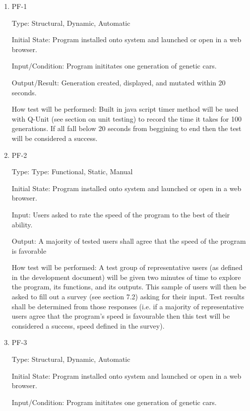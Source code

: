 \documentclass[12pt, titlepage]{article}
\begin{document}
\begin{enumerate}

\item{PF-1\\}

Type: Structural, Dynamic, Automatic
					
Initial State: Program installed onto system and launched or open in a web browser.
					
Input/Condition: Program inititates one generation of genetic cars.
					
Output/Result: Generation created, displayed, and mutated within 20 seconds.
					
How test will be performed: Built in java script timer method will be used with Q-Unit (see section on unit testing) to record the time it takes for 100 generations. If all fall below 20 seconds from beggining to end then the test will be considered a success.


\item{PF-2\\}

Type: Type: Functional, Static, Manual
					
Initial State: Program installed onto system and launched or open in a web browser.
					
Input: Users asked to rate the speed of the program to the best of their ability.
					
Output: A majority of tested users shall agree that the speed of the program is favorable
					
 How test will be performed: A test group of representative users (as defined in the development document) will be given two minutes of time to explore the program, its functions, and its outputs. This sample of users will then be asked to fill out a survey (see section 7.2) asking for their input. Test results shall be determined from those responses (i.e. if a majority of representative users agree that the program's speed is favourable then this test will be considered a success, speed defined in the survey).

\item{PF-3\\}

Type: Structural, Dynamic, Automatic
					
Initial State: Program installed onto system and launched or open in a web browser.
					
Input/Condition: Program inititates one generation of genetic cars.
					

\end{enumerate}
\end{document}
